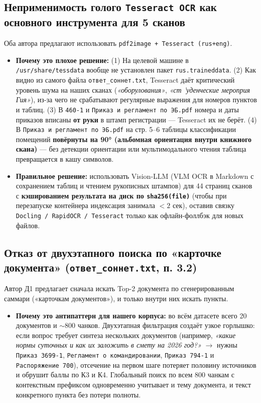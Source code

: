 \documentclass[10pt,a4paper]{article}
\begin{document}
\subsection{Неприменимость голого \texttt{Tesseract OCR} как основного инструмента для 5 сканов}
Оба автора предлагают использовать \texttt{pdf2image + Tesseract (rus+eng)}.
\begin{itemize}
    \item \textbf{Почему это плохое решение:}
    (1) На целевой машине в \texttt{/usr/share/tessdata} вообще не установлен пакет \texttt{rus.traineddata}.
    (2) Как видно из самого файла \texttt{ответ\_соннет.txt}, Tesseract даёт критический уровень шума на наших сканах (\emph{«оборулования»}, \emph{«ст 'уденческие мероприя Гия»}), из-за чего не срабатывают регулярные выражения для номеров пунктов и таблиц.
    (3) В \texttt{460-1} и \texttt{Приказ и регламент по ЭБ.pdf} номера и даты приказов вписаны \textbf{от руки} в штамп регистрации — Tesseract их не берёт.
    (4) В \texttt{Приказ и регламент по ЭБ.pdf} на стр. 5--6 таблицы классификации помещений \textbf{повёрнуты на 90° (альбомная ориентация внутри книжного скана)} — без детекции ориентации или мультимодального чтения таблица превращается в кашу символов.
    \item \textbf{Правильное решение:} использовать Vision-LLM (VLM OCR в Markdown с сохранением таблиц и чтением рукописных штампов) для 44 страниц сканов с \textbf{кэшированием результата на диск по \texttt{sha256(file)}} (чтобы при перезапуске контейнера индексация занимала $<2$ сек), оставив связку \texttt{Docling / RapidOCR / Tesseract} только как офлайн-фоллбэк для новых файлов.
\end{itemize}

\subsection{Отказ от двухэтапного поиска по «карточке документа» (\texttt{ответ\_соннет.txt}, п. 3.2)}
Автор Д1 предлагает сначала искать Top-2 документа по сгенерированным саммари («карточкам документов»), и только внутри них искать пункты.
\begin{itemize}
    \item \textbf{Почему это антипаттерн для нашего корпуса:} во всём датасете всего 20 документов и $\sim$800 чанков. Двухэтапная фильтрация создаёт узкое горлышко: если вопрос требует синтеза нескольких документов (например, \emph{«какие нормы суточных и как их заложить в смету на 2026 год?»} $\to$ нужны \texttt{Приказ 3699-1}, \texttt{Регламент о командировании}, \texttt{Приказ 794-1} и \texttt{Распоряжение 700}), отсечение на первом шаге потеряет половину источников и обрушит баллы по К3 и К4. Глобальный поиск по всем 800 чанкам с контекстным префиксом одновременно учитывает и тему документа, и текст конкретного пункта без потери полноты.
\end{itemize}
\end{document}
